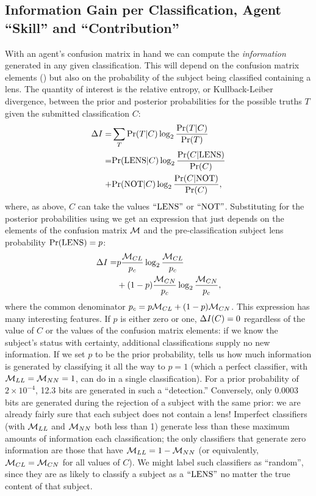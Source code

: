\documentclass[useAMS,usenatbib,a4paper]{mn2e}
\begin{document}
\subsection{Information Gain per Classification, Agent ``Skill'' and ``Contribution''}
\label{appendix:swap:examples}

With an agent's confusion matrix in hand we can compute the
\emph{information} generated in any given classification. This will
depend on the confusion matrix elements () but also on
the probability of the subject being classified containing a lens. The
quantity of interest is the relative entropy, or Kullback-Leiber
divergence, between the prior and
posterior probabilities for the possible truths $T$
given the submitted classification $C$:
\begin{align}
\Delta I =& \sum_T {\rm Pr}(T|C) \log_2 \frac{{\rm Pr}(T|C)}{{\rm Pr}(T)}     \notag \\
             =&    {\rm Pr}({\rm LENS}|C) \log_2 \frac{{\rm Pr}(C|{\rm LENS})}{{\rm Pr}(C)} \notag \\
             +&    {\rm Pr}({\rm NOT}|C)  \log_2 \frac{{\rm Pr}(C|{\rm NOT})}{{\rm Pr}(C)},
\end{align}
where, as above, $C$ can take the values ${\rm ``LENS"}$ or ${\rm ``NOT"}$. 
Substituting for the posterior probabilities using  we get
an expression that just depends on the elements of the 
confusion matrix $\mathcal{M}$ and the pre-classification subject lens
probability ${\rm Pr}({\rm LENS}) = p$:
\begin{align}
\Delta I =    &     p \frac{\mathcal{M}_{CL}}{p_c} \log_2 \frac{\mathcal{M}_{CL}}{p_c}  \notag \\
                  & +(1-p)\frac{\mathcal{M}_{CN}}{p_c} \log_2 \frac{\mathcal{M}_{CN}}{p_c},
  \label{eq:app:infogain}
\end{align}
where the common denominator $p_c = p\mathcal{M}_{CL} + (1-p)\mathcal{M}_{CN}$. This
expression has many interesting features.  If $p$ is either zero or one,
$\Delta I(C) = 0$  regardless of the value of $C$ or the values of
the confusion matrix elements: if we know the subject's status with
certainty, additional classifications supply no new information. If we
set $p$ to be the prior probability,  tells us how
much information is generated by classifying it all the way to $p = 1$
(which a perfect classifier, with $\mathcal{M}_{LL} = \mathcal{M}_{NN} = 1$, can do in a
single classification). For a prior probability of $2\times 10^{-4}$, 
12.3 bits are generated in such a ``detection.''  Conversely, only
0.0003 bits are generated during the rejection of a subject with the
same prior: we are already fairly sure that each subject does not
contain a lens! Imperfect classifiers (with $\mathcal{M}_{LL}$ and $\mathcal{M}_{NN}$
both less than 1)  generate less than these maximum amounts of
information each classification; the only classifiers that generate zero
information are those that have $\mathcal{M}_{LL} = 1 - \mathcal{M}_{NN}$ (or
equivalently, $\mathcal{M}_{CL} = \mathcal{M}_{CN}$ for all values of $C$). We might
label such classifiers as ``random'', since they are as likely to
classify a subject as a ${\rm ``LENS"}$ no matter the true content of that
subject. 
\end{document}

